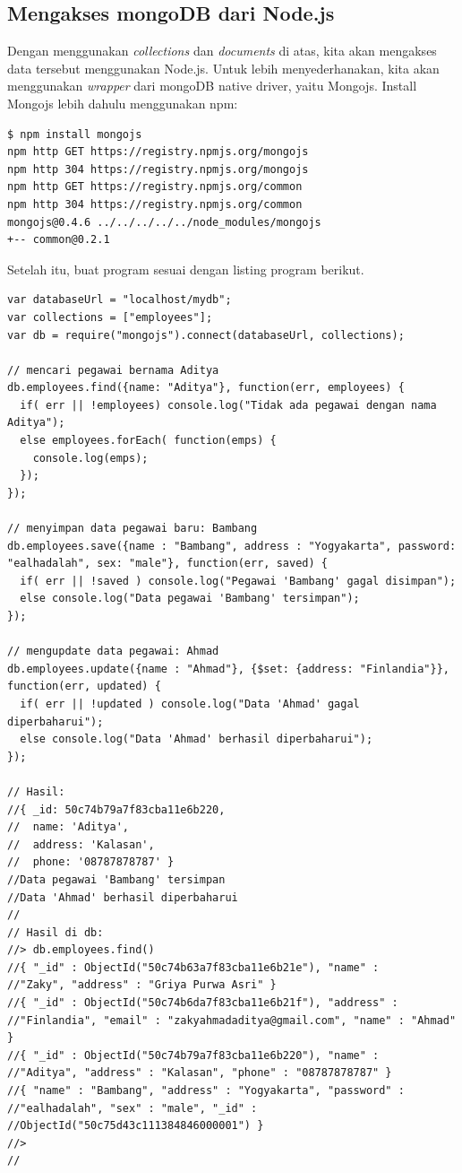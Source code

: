\subsection{Mengakses mongoDB dari Node.js}

Dengan menggunakan \textit{collections} dan \textit{documents} di atas, kita akan mengakses data tersebut menggunakan Node.js. Untuk lebih menyederhanakan, kita akan menggunakan \textit{wrapper} dari mongoDB native driver, yaitu Mongojs. Install Mongojs lebih dahulu menggunakan npm:

\lstset{language=bash,caption=Instalasi driver mongoDB}
\begin{lstlisting}
$ npm install mongojs
npm http GET https://registry.npmjs.org/mongojs
npm http 304 https://registry.npmjs.org/mongojs
npm http GET https://registry.npmjs.org/common
npm http 304 https://registry.npmjs.org/common
mongojs@0.4.6 ../../../../../node_modules/mongojs
+-- common@0.2.1
\end{lstlisting}

Setelah itu, buat program sesuai dengan listing program berikut.

\lstset{language=bash,caption=Mengakses mongoDB dari Node.js}
\begin{lstlisting}
var databaseUrl = "localhost/mydb";
var collections = ["employees"];
var db = require("mongojs").connect(databaseUrl, collections);

// mencari pegawai bernama Aditya
db.employees.find({name: "Aditya"}, function(err, employees) {
  if( err || !employees) console.log("Tidak ada pegawai dengan nama Aditya");
  else employees.forEach( function(emps) {
    console.log(emps);
  });
});

// menyimpan data pegawai baru: Bambang
db.employees.save({name : "Bambang", address : "Yogyakarta", password: "ealhadalah", sex: "male"}, function(err, saved) {
  if( err || !saved ) console.log("Pegawai 'Bambang' gagal disimpan");
  else console.log("Data pegawai 'Bambang' tersimpan");
});

// mengupdate data pegawai: Ahmad
db.employees.update({name : "Ahmad"}, {$set: {address: "Finlandia"}}, function(err, updated) {
  if( err || !updated ) console.log("Data 'Ahmad' gagal diperbaharui");
  else console.log("Data 'Ahmad' berhasil diperbaharui");
});

// Hasil:
//{ _id: 50c74b79a7f83cba11e6b220,
//  name: 'Aditya',
//  address: 'Kalasan',
//  phone: '08787878787' }
//Data pegawai 'Bambang' tersimpan
//Data 'Ahmad' berhasil diperbaharui
//
// Hasil di db:
//> db.employees.find()
//{ "_id" : ObjectId("50c74b63a7f83cba11e6b21e"), "name" : 
//"Zaky", "address" : "Griya Purwa Asri" }
//{ "_id" : ObjectId("50c74b6da7f83cba11e6b21f"), "address" :
//"Finlandia", "email" : "zakyahmadaditya@gmail.com", "name" : "Ahmad" }
//{ "_id" : ObjectId("50c74b79a7f83cba11e6b220"), "name" :
//"Aditya", "address" : "Kalasan", "phone" : "08787878787" }
//{ "name" : "Bambang", "address" : "Yogyakarta", "password" : 
//"ealhadalah", "sex" : "male", "_id" : 
//ObjectId("50c75d43c111384846000001") }
//> 
//  
\end{lstlisting}

